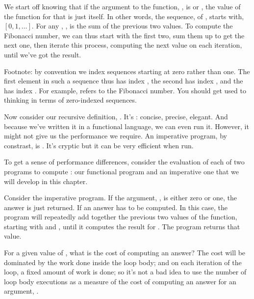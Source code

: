 \documentclass[letterpaper,10pt,english]{sphinxmanual}
\begin{document}
We start off knowing that if the argument to the function, , is 
or , the value of the function for that  is just  itself.  In
other words, the sequence,  of , starts with, \([0, 1, \ldots ]\).  For any , ,
is the sum of the previous two values.  To compute the 
Fibonacci number, we can thus start with the first two, sum them up to
get the next one, then iterate this process, computing the next value
on each iteration, until we’ve got the result.

Footnote: by convention we index sequences starting at zero rather
than one. The first element in such a sequence thus has index , the
second has index , and the  has index . For example,
 refers to the  Fibonacci number. You should get used to
thinking in terms of zero-indexed sequences.

Now consider our recursive definition, . It’s :
concise, precise, elegant.  And because we’ve written it in a
functional language, we can even run it. However, it might not give us
the performance we require. An imperative program, by constrast, is
. It’s cryptic but it can be very efficient when run.

To get a sense of performance differences, consider the evaluation of
each of two programs to compute : our functional program and
an imperative one that we will develop in this chapter.

Consider the imperative program. If the argument, , is either zero
or one, the answer is just returned. If  an answer has to be
computed. In this case, the program will repeatedly add together the
previous two values of the function, starting with  and , until
it computes the result for .  The program returns that value.

For a given value of , what is the cost of computing an answer?
The cost will be dominated by the work done inside the loop body; and
on each iteration of the loop, a fixed amount of work is done; so it’s
not a bad idea to use the number of loop body executions as a measure
of the cost of computing an answer for an argument, .
\end{document}
